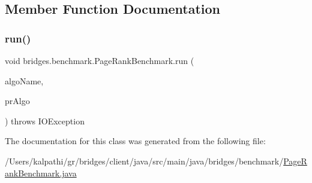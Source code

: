 \subsection{Member Function Documentation}
\mbox{\label{classbridges_1_1benchmark_1_1_page_rank_benchmark_a6738599d19f7a856a16615f69050c8b3}} 
\subsubsection{\texorpdfstring{run()}{run()}}
{\footnotesize\ttfamily void bridges.\+benchmark.\+Page\+Rank\+Benchmark.\+run (\begin{DoxyParamCaption}\item[{String}]{algo\+Name,  }\item[{Consumer$<$ \mbox{\hyperlink{classbridges_1_1benchmark_1_1_page_rank_params}{Page\+Rank\+Params}} $>$}]{pr\+Algo }\end{DoxyParamCaption}) throws I\+O\+Exception}



The documentation for this class was generated from the following file\+:\begin{DoxyCompactItemize}
\item 
/\+Users/kalpathi/gr/bridges/client/java/src/main/java/bridges/benchmark/\mbox{\hyperlink{_page_rank_benchmark_8java}{Page\+Rank\+Benchmark.\+java}}\end{DoxyCompactItemize}
